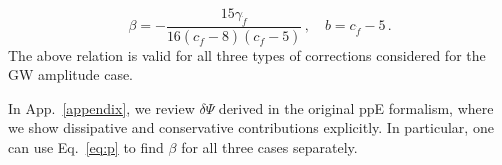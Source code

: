 \documentclass[prd,twocolumn,nofootinbib]{revtex4-1}
\begin{document}
\begin{equation}
\label{eq:2v}
\beta=-\frac{15 \text{$\gamma_{\dot{f}} $}}{16 (\text{$c_{\dot{f}}$}-8) (\text{$c_{\dot{f}}$}-5)}\,, \quad b=c_{\dot{f}}-5\,.
\end{equation}
The above relation is valid for all three types of corrections considered for the GW amplitude case. 

In App.~\ref{appendix}, we review $\delta\Psi$ derived in the original ppE formalism, where we show dissipative and conservative contributions explicitly. In particular, one can use Eq.~\eqref{eq:p} to find $\beta$ for all three cases separately.




\end{document}
